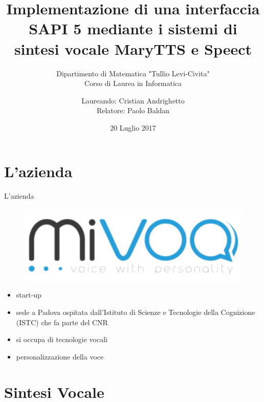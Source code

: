 \documentclass{beamer}
\subtitle{Dipartimento di Matematica "Tullio Levi-Civita"\\
Corso di Laurea in Informatica}
\title{Implementazione di una interfaccia SAPI 5 mediante i sistemi di sintesi vocale MaryTTS e Speect }
\author{Laureando: Cristian Andrighetto\\
		Relatore: Paolo Baldan}
\date{20 Luglio 2017}
\begin{document}
	\maketitle

	\section{L'azienda}

	\begin{frame}{L'azienda}

		\begin{figure}[H]
			\centering
			\includegraphics{images/logo-mivoq.png}
		\end{figure}
	
		\begin{itemize}
			\item start-up
			\item sede a Padova ospitata dall'Istituto di Scienze e Tecnologie della Cognizione (ISTC) che fa parte del CNR
			\item si occupa di tecnologie vocali
			\item personalizzazione della voce
			
		\end{itemize}
	\end{frame}

	\section{Sintesi Vocale}
	
\end{document}
